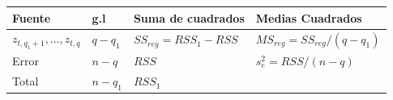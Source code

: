 \documentclass[12pt,]{krantz}
\theoremstyle{definition}
\theoremstyle{definition}
\theoremstyle{definition}
\theoremstyle{remark}
\begin{document}
\begin{longtable}[]{@{}llll@{}}
\toprule
\begin{minipage}[b]{0.10\columnwidth}\raggedright\strut
Fuente\strut
\end{minipage} & \begin{minipage}[b]{0.07\columnwidth}\raggedright\strut
g.l\strut
\end{minipage} & \begin{minipage}[b]{0.25\columnwidth}\raggedright\strut
Suma de cuadrados\strut
\end{minipage} & \begin{minipage}[b]{0.23\columnwidth}\raggedright\strut
Medias Cuadrados\strut
\end{minipage}\tabularnewline
\midrule
\endhead
\begin{minipage}[t]{0.10\columnwidth}\raggedright\strut
\(z_{t,q_1+1},\ldots,z_{t,q}\)\strut
\end{minipage} & \begin{minipage}[t]{0.07\columnwidth}\raggedright\strut
\(q-q_1\)\strut
\end{minipage} & \begin{minipage}[t]{0.25\columnwidth}\raggedright\strut
\(SS_{reg}=RSS_1-RSS\)\strut
\end{minipage} & \begin{minipage}[t]{0.23\columnwidth}\raggedright\strut
\(MS_{reg}=SS_{reg}/(q-q_1)\)\strut
\end{minipage}\tabularnewline
\begin{minipage}[t]{0.10\columnwidth}\raggedright\strut
Error\strut
\end{minipage} & \begin{minipage}[t]{0.07\columnwidth}\raggedright\strut
\(n-q\)\strut
\end{minipage} & \begin{minipage}[t]{0.25\columnwidth}\raggedright\strut
\(RSS\)\strut
\end{minipage} & \begin{minipage}[t]{0.23\columnwidth}\raggedright\strut
\(s_e^2=RSS/(n-q)\)\strut
\end{minipage}\tabularnewline
\begin{minipage}[t]{0.10\columnwidth}\raggedright\strut
Total\strut
\end{minipage} & \begin{minipage}[t]{0.07\columnwidth}\raggedright\strut
\(n-q_1\)\strut
\end{minipage} & \begin{minipage}[t]{0.25\columnwidth}\raggedright\strut
\(RSS_1\)\strut
\end{minipage} & \begin{minipage}[t]{0.23\columnwidth}\raggedright\strut
\strut
\end{minipage}\tabularnewline
\bottomrule
\end{longtable}
\end{document}
